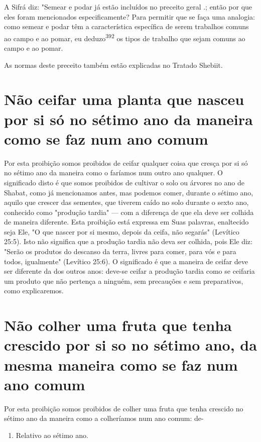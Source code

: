\begin{itemize}
\begin{enumrate}
\begin{itemize}
\begin{itemize}
\begin{itemize}
A Sifrá diz: "Semear e podar já estão incluídos no preceito geral
.; então por que eles foram mencionados
especificamente? Para permitir que se faça uma analogia: como semear e
podar têm a característica específica de se­rem trabalhos comuns ao
campo e ao pomar, eu deduzo\textsuperscript{392} os tipos de traba­lho
que sejam comuns ao campo e ao pomar.


As normas deste preceito também estão explicadas no Tratado Shebiit.

\section{Não ceifar uma planta que nasceu por si só no sétimo ano da
maneira como se faz num ano comum}

Por esta proibição somos proibidos de ceifar qualquer coisa que cres­ça
por si só no sétimo ano da maneira como o faríamos num outro ano
qual­quer. O significado disto é que somos proibidos de cultivar o solo
ou árvores no ano de Shabat, como já mencionamos antes, mas podemos
comer, durante o sétimo ano, aquilo que crescer das sementes, que
tiverem caído no solo du­rante o sexto ano, conhecido como "produção
tardia" --- com a diferença de que ela deve ser colhida de maneira
diferente. Esta proibição está expressa em Suas palavras, enaltecido
seja Ele, "O que nascer por si mesmo, depois da ceifa, não segarás"
(Levítico 25:5). Isto não significa que a produção tardia não deva ser
colhida, pois Ele diz: "Serão os produtos do descanso da terra, livres
para comer, para vós e para todos, igualmente" (Levítico 25:6). O
significado é que a maneira de ceifar deve ser diferente da dos outros
anos: deve-se ceifar a pro­dução tardia como se ceifaria um produto que
não pertença a ninguém, sem precauções e sem preparativos, como
explicaremos.

\section{Não colher uma fruta que tenha crescido por si so no sétimo ano, da
mesma maneira como se faz num ano comum}

Por esta proibição somos proibidos de colher uma fruta que tenha
crescido no sétimo ano da maneira como a colheríamos num ano comum: de-


\begin{enumerate}
\def\labelenumi{\arabic{enumi}.}
\setcounter{enumi}{390}
\item
 
 Relativo ao sétimo ano.
 

\end{enumerate}
\end{itemize}
\end{itemize}
\end{itemize}
\end{enumrate}
\end{itemize}
